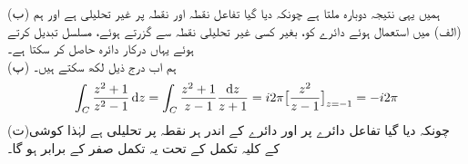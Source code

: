 (ب) \quad ہمیں یہی نتیجہ دوبارہ ملتا ہے چونکہ دیا گیا تفاعل نقطہ  اور نقطہ  پر غیر تحلیلی ہے اور ہم (الف) میں استعمال ہوئے دائرے کو، بغیر کسی غیر تحلیلی نقطہ سے گزرتے ہوئے، مسلسل تبدیل کرتے ہوئے یہاں درکار دائرہ حاصل کر سکتا ہے۔\\
(پ) \quad ہم اب درج ذیل لکھ سکتے ہیں۔
\begin{align*}
\int_C \frac{z^2+1}{z^2-1}\dif z=\int_C \frac{z^2+1}{z-1}\frac{\dif z}{z+1}=i2\pi\big[\frac{z^2}{z-1}\big]_{z=-1}=-i2\pi
\end{align*}
(ت)\quad چونکہ دیا گیا تفاعل دائرے پر اور دائرے کے اندر ہر نقطہ پر تحلیلی ہے لہٰذا کوشی کے کلیہ تکمل کے تحت یہ تکمل صفر کے برابر ہو گا۔ 


